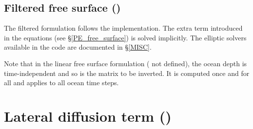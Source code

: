 \documentclass[NEMO_book]{subfiles}
\begin{document}


\subsection{Filtered free surface ()}
\label{DYN_spg_fltp}

The filtered formulation follows the \citet{Roullet_Madec_JGR00} implementation. 
The extra term introduced in the equations (see \S\ref{PE_free_surface}) is solved implicitly. 
The elliptic solvers available in the code are documented in \S\ref{MISC}.


Note that in the linear free surface formulation ( not defined), the ocean depth 
is time-independent and so is the matrix to be inverted. It is computed once and for all and applies to all ocean time steps. 

\section  [Lateral diffusion term (\textit{dynldf})]
		{Lateral diffusion term ()}
\label{DYN_ldf}
\end{document}
